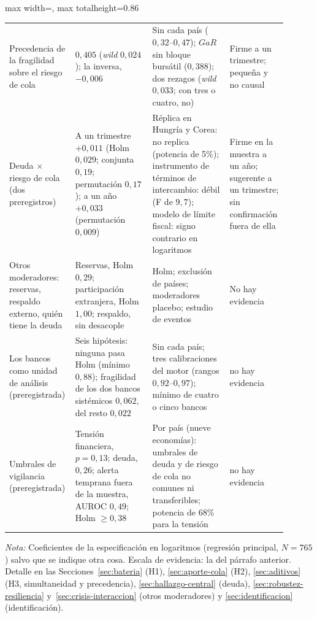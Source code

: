 \begin{table}[p]
\begin{adjustbox}{max width=\linewidth, max totalheight=0.86\textheight}
\begin{tabular}{>{\raggedright\arraybackslash}p{0.19\linewidth}>{\raggedright\arraybackslash}p{0.27\linewidth}>{\raggedright\arraybackslash}p{0.27\linewidth}>{\raggedright\arraybackslash}p{0.17\linewidth}}
\addlinespace
Precedencia de la fragilidad sobre el riesgo de cola & $0{,}405$ (\textit{wild} $0{,}024$); la inversa, $-0{,}006$ & Sin cada país ($0{,}32$--$0{,}47$); $GaR$ sin bloque bursátil ($0{,}388$); dos rezagos (\textit{wild} $0{,}033$; con tres o cuatro, no) & Firme a un trimestre; pequeña y no causal \\
\addlinespace
Deuda $\times$ riesgo de cola (dos preregistros) & A un trimestre $+0{,}011$ (Holm $0{,}029$; conjunta $0{,}19$; permutación $0{,}17$); a un año $+0{,}033$ (permutación $0{,}009$) & Réplica en Hungría y Corea: no replica (potencia de 5\%); instrumento de términos de intercambio: débil (F de $9{,}7$); modelo de límite fiscal: signo contrario en logaritmos & Firme en la muestra a un año; sugerente a un trimestre; sin confirmación fuera de ella \\
\addlinespace
Otros moderadores: reservas, respaldo externo, quién tiene la deuda & Reservas, Holm $0{,}29$; participación extranjera, Holm $1{,}00$; respaldo, sin desacople & Holm; exclusión de países; moderadores placebo; estudio de eventos & No hay evidencia \\
\addlinespace
Los bancos como unidad de análisis (preregistrada) & Seis hipótesis: ninguna pasa Holm (mínimo $0{,}88$); fragilidad de los dos bancos sistémicos $0{,}062$, del resto $0{,}022$ & Sin cada país; tres calibraciones del motor (rangos $0{,}92$--$0{,}97$); mínimo de cuatro o cinco bancos & no hay evidencia \\
\addlinespace
Umbrales de vigilancia (preregistrada) & Tensión financiera, $p=0{,}13$; deuda, $0{,}26$; alerta temprana fuera de la muestra, AUROC $0{,}49$; Holm $\geq0{,}38$ & Por país (nueve economías): umbrales de deuda y de riesgo de cola no comunes ni transferibles; potencia de 68\% para la tensión & no hay evidencia \\
\bottomrule
\end{tabular}
\end{adjustbox}
\par\smallskip\parbox{0.95\linewidth}{\footnotesize \textit{Nota:} Coeficientes de la especificación en logaritmos (regresión principal, $N=765$) salvo que se indique otra cosa. Escala de evidencia: la del párrafo anterior. Detalle en las Secciones~\ref{sec:bateria} (H1), \ref{sec:aporte-cola} (H2), \ref{sec:aditivos} (H3, simultaneidad y precedencia), \ref{sec:hallazgo-central} (deuda), \ref{sec:robustez-resiliencia} y~\ref{sec:crisis-interaccion} (otros moderadores) y \ref{sec:identificacion} (identificación).}
\end{table}

